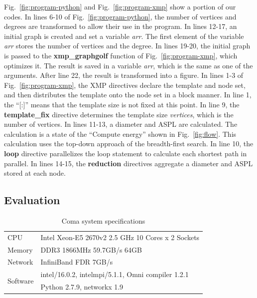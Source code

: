 \documentclass[graybox]{svmult}
\begin{document}
Fig.~\ref{fig:program-python} and  Fig.~\ref{fig:program-xmp} show a portion of our codes.
In lines 6-10 of Fig.~\ref{fig:program-python}, 
the number of vertices and degrees are transformed to allow their use in the program. 
In lines 12-17, an initial graph is created and set a variable {\it arr}. 
The first element of the variable {\it arr} stores the number of vertices and the degree.
In lines 19-20, 
the initial graph is passed to the {\bf xmp\_graphgolf} function of Fig.~\ref{fig:program-xmp}, which optimizes it. 
The result is saved in a variable {\it arr}, 
which is the same as one of the arguments. 
After  line 22, the result is transformed into a figure. 
In lines 1-3 of Fig.~\ref{fig:program-xmp}, 
the XMP directives declare the template and node set, 
and then distributes the template onto the node set in a block manner. 
In line 1, the ``[:]'' means that the template size is not fixed at this point. 
In line 9, the \textbf{template\_fix} directive determines the template size {\it vertices}, which is the number of vertices. 
In lines 11-13, a diameter and ASPL are calculated. The calculation is a state of the ``Compute energy'' shown in Fig.~\ref{fig:flow}. 
This calculation uses the top-down approach of the breadth-first search.
In line 10, the {\bf loop} directive parallelizes the loop statement to calculate each shortest path in parallel. In lines 14-15, 
the {\bf reduction} directives aggregate a diameter and ASPL stored at each node.

\subsection{Evaluation}
\begin{table}[t] 
\renewcommand{\arraystretch}{1.2}
\centering
\caption{Coma system specifications} \label{tab:coma}
\begin{tabular}{l|l}\hline \hline
CPU & Intel Xeon-E5 2670v2 2.5 GHz 10 Cores x 2 Sockets \\
Memory & DDR3 1866MHz 59.7GB/s 64GB \\
Network & InfiniBand FDR 7GB/s \\
\multirow{2}{*}{Software} & intel/16.0.2, intelmpi/5.1.1, Omni compiler 1.2.1 \\
& Python 2.7.9, networkx 1.9\\ \hline
\end{tabular}
\end{table}
\end{document}
